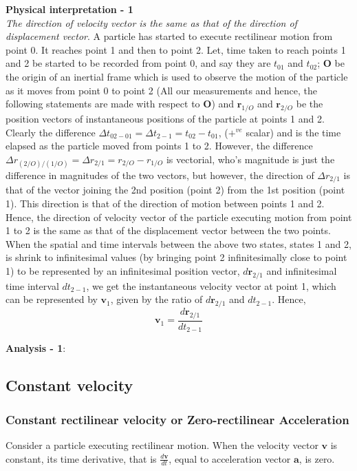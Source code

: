 \begin{flushright}
\begin{minipage}[h!]{10.5cm}
\small{
\textbf{Physical interpretation - 1}\\ \textit{The direction of velocity vector is the same as that of the direction of displacement vector}. A particle has started to execute rectilinear motion from point 0. It reaches point 1 and then to point 2. Let, time taken to reach points 1 and 2 be started to be recorded from point 0, and say they are $t_{01}$ and $t_{02}$; \textbf{O} be the origin of an inertial frame which is used to observe the motion of the particle as it moves from point 0 to point 2 (All our measurements and hence, the following statements are made with respect to \textbf{O}) and $\mathbf{r}_{1/O}$ and $\mathbf{r}_{2/O}$ be the position vectors of instantaneous positions of the particle at points 1 and 2. Clearly the difference $\Delta t_{02-01} = \Delta t_{2-1} = t_{02}-t_{01}$, ($+^{ve}$ scalar) and is the time elapsed as the particle moved from points 1 to 2. However, the difference $\Delta r_{(2/O)/(1/O)} = \Delta r_{2/1} = r_{2/O}-r_{1/O}$ is vectorial, who's magnitude is just the difference in magnitudes of the two vectors, but however, the direction of $\Delta r_{2/1}$ is that of the vector joining the 2nd position (point 2) from the 1st position (point 1). This direction is that of the direction of motion between points 1 and 2. Hence, the direction of velocity vector of the particle executing motion from point 1 to 2 is the same as that of the displacement vector between the two points. When the spatial and time intervals between the above two states, states 1 and 2, is shrink to infinitesimal values (by bringing point 2 infinitesimally close to point 1) to be represented by an infinitesimal position vector, $d\mathbf{r}_{2/1}$ and infinitesimal time interval $dt_{2-1}$, we get the instantaneous velocity vector at point 1, which can be represented by $\mathbf{v}_{1}$, given by the ratio of $d\mathbf{r}_{2/1}$ and $dt_{2-1}$. Hence,\[\mathbf{v}_{1}=\frac{d\mathbf{r}_{2/1}}{dt_{2-1}} \]
}
\end{minipage}
\end{flushright}

\textbf{Analysis - 1}:

\subsection{Constant velocity}

\subsubsection{Constant rectilinear velocity or Zero-rectilinear Acceleration}
Consider a particle executing rectilinear motion. When the velocity vector $\textbf{v}$ is constant, its time derivative, that is $\frac{d\mathbf{v}}{dt}$, equal to acceleration vector $\mathbf{a}$, is zero.

